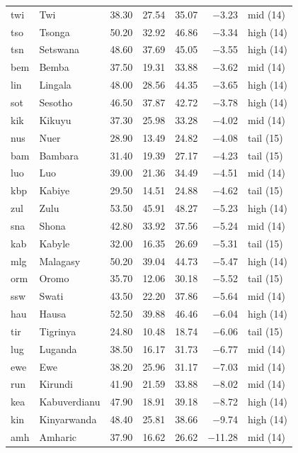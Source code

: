 {\begin{longtable}{@{}llrrrrl@{}}
twi & Twi & 38.30 & 27.54 & 35.07 & \ensuremath{-}3.23 & mid (14) \\
tso & Tsonga & 50.20 & 32.92 & 46.86 & \ensuremath{-}3.34 & high (14) \\
tsn & Setswana & 48.60 & 37.69 & 45.05 & \ensuremath{-}3.55 & high (14) \\
bem & Bemba & 37.50 & 19.31 & 33.88 & \ensuremath{-}3.62 & mid (14) \\
lin & Lingala & 48.00 & 28.56 & 44.35 & \ensuremath{-}3.65 & high (14) \\
sot & Sesotho & 46.50 & 37.87 & 42.72 & \ensuremath{-}3.78 & high (14) \\
kik & Kikuyu & 37.30 & 25.98 & 33.28 & \ensuremath{-}4.02 & mid (14) \\
nus & Nuer & 28.90 & 13.49 & 24.82 & \ensuremath{-}4.08 & tail (15) \\
bam & Bambara & 31.40 & 19.39 & 27.17 & \ensuremath{-}4.23 & tail (15) \\
luo & Luo & 39.00 & 21.36 & 34.49 & \ensuremath{-}4.51 & mid (14) \\
kbp & Kabiye & 29.50 & 14.51 & 24.88 & \ensuremath{-}4.62 & tail (15) \\
zul & Zulu & 53.50 & 45.91 & 48.27 & \ensuremath{-}5.23 & high (14) \\
sna & Shona & 42.80 & 33.92 & 37.56 & \ensuremath{-}5.24 & mid (14) \\
kab & Kabyle & 32.00 & 16.35 & 26.69 & \ensuremath{-}5.31 & tail (15) \\
mlg & Malagasy & 50.20 & 39.04 & 44.73 & \ensuremath{-}5.47 & high (14) \\
orm & Oromo & 35.70 & 12.06 & 30.18 & \ensuremath{-}5.52 & tail (15) \\
ssw & Swati & 43.50 & 22.20 & 37.86 & \ensuremath{-}5.64 & mid (14) \\
hau & Hausa & 52.50 & 39.88 & 46.46 & \ensuremath{-}6.04 & high (14) \\
tir & Tigrinya & 24.80 & 10.48 & 18.74 & \ensuremath{-}6.06 & tail (15) \\
lug & Luganda & 38.50 & 16.17 & 31.73 & \ensuremath{-}6.77 & mid (14) \\
ewe & Ewe & 38.20 & 25.96 & 31.17 & \ensuremath{-}7.03 & mid (14) \\
run & Kirundi & 41.90 & 21.59 & 33.88 & \ensuremath{-}8.02 & mid (14) \\
kea & Kabuverdianu & 47.90 & 18.91 & 39.18 & \ensuremath{-}8.72 & high (14) \\
kin & Kinyarwanda & 48.40 & 25.81 & 38.66 & \ensuremath{-}9.74 & high (14) \\
amh & Amharic & 37.90 & 16.62 & 26.62 & \ensuremath{-}11.28 & mid (14) \\
\end{longtable}
}

